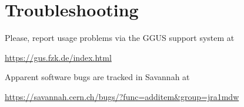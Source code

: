 %
%
%
%
\section{Troubleshooting}

Please, report usage problems via the GGUS support system at
\begin{center}
\url{https://gus.fzk.de/index.html}
\end{center}
Apparent software bugs are tracked in Savannah at
\begin{center}
\url{https://savannah.cern.ch/bugs/?func=additem&group=jra1mdw}
\end{center}

